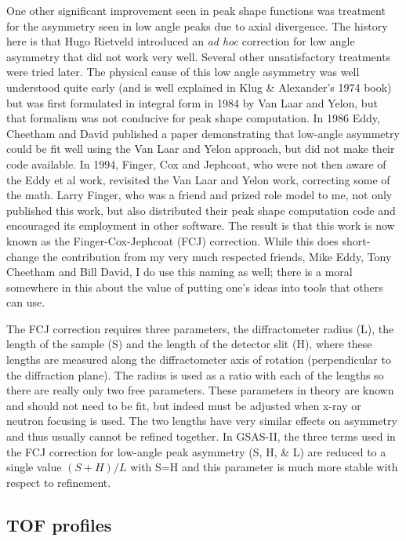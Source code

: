 One other significant improvement seen in peak shape functions was treatment for the asymmetry seen in low angle peaks due to axial divergence. The history here is that Hugo Rietveld introduced an \textit{ad hoc} correction for low angle asymmetry that did not work very well. Several other unsatisfactory treatments were tried later. The physical cause of this low angle asymmetry was well understood quite early (and is well explained in Klug \& Alexander’s 1974 book) but was first formulated in integral form in 1984 by Van Laar and Yelon, but that formalism was not conducive for peak shape computation. In 1986 Eddy, Cheetham and David published a paper demonstrating that low-angle asymmetry could be fit well using the Van Laar and Yelon approach, but did not make their code available. In 1994, Finger, Cox and Jephcoat, who were not then aware of the Eddy et al work, revisited the Van Laar and Yelon work, correcting some of the math. Larry Finger, who was a friend and prized role model to me, not only published this work, but also distributed their peak shape computation code and encouraged its employment in other software. The result is that this work is now known as the Finger-Cox-Jephcoat (FCJ) correction. While this does short-change the contribution from my very much respected friends, Mike Eddy, Tony Cheetham and Bill David, I do use this naming as well; there is a moral somewhere in this about the value of putting one’s ideas into tools that others can use.

 The FCJ correction requires three parameters, the diffractometer radius (L), the length of the sample (S) and the length of the detector slit (H), where these lengths are measured along the diffractometer axis of rotation (perpendicular to the diffraction plane). The radius is used as a ratio with each of the lengths so there are really only two free parameters. These parameters in theory are known and should not need to be fit, but indeed must be adjusted when x-ray or neutron focusing is used. The two lengths have very similar effects on asymmetry and thus usually cannot be refined together. 
In GSAS-II, the three terms used in the FCJ correction for low-angle peak asymmetry (S, H, \& L) are reduced to a single value $(S+H)/L$ with S=H and this parameter is much more stable with respect to refinement.

\subsection{TOF profiles}

